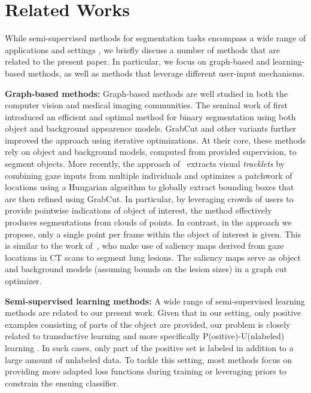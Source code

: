 \section{Related Works}
\label{sec:related_works}
While semi-supervised methods for segmentation tasks encompass a wide range of applications and settings \cite{Chapelle2006}, we briefly discuss a number of methods that are related to the present paper. In particular, we focus on graph-based and learning-based methods, as well as methods that leverage different user-input mechanisms.

\noindent
{\bf Graph-based methods:} 
Graph-based methods are well studied in both the computer vision and medical imaging communities. The seminal work of \cite{boykov2006} first introduced an efficient and optimal method for binary segmentation using both object and background appearence models. GrabCut and other variants \cite{rother04,yu2014} further improved the approach using iterative optimizations. At their core, these methods rely on object and background models, computed from provided supervision, to segment objects. More recently, the approach of~\cite{karthikeyan13} extracts visual {\it tracklets} by combining gaze inputs from multiple individuals and optimizes a patchwork of locations using a Hungarian algorithm to globally extract bounding boxes that are then refined using GrabCut. In particular, by leveraging crowds of users to provide pointwise indications of object of interest, the method effectively produces segmentations from clouds of points. In contrast, in the approach we propose, only a single point per frame within the object of interest is given. This is similar to the work of~\cite{khosravan16}, who make use of saliency maps \cite{koch98} derived from gaze locations in CT scans to segment lung lesions. The saliency maps serve as object and background models (assuming bounds on the lesion sizes) in a graph cut optimizer.

\noindent
{\bf Semi-supervised learning methods:} A wide range of semi-supervised learning methods are related to our present work. Given that in our setting, only positive examples consisting of parts of the object are provided, our problem is closely related to transductive learning \cite{Burges13,Guyon17} and more specifically P(ositive)-U(nlabeled) learning \cite{Li2005,Kiryo2017}. In such cases,  only part of the positive set is labeled in addition to a large amount of unlabeled data. To tackle this setting, most methods focus on providing more adapted loss functions during training or leveraging priors to constrain the ensuing classifier.

